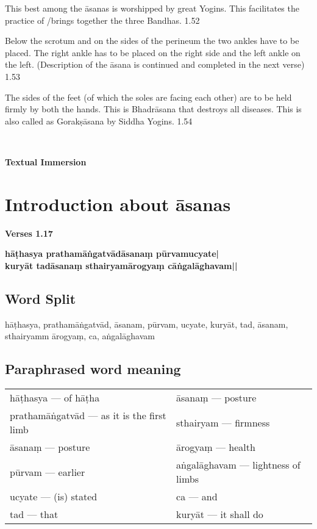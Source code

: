 This best among the āsanas is worshipped by great Yogins. This facilitates the practice of /brings together the three Bandhas.  1.52
\medskip


Below the scrotum and on the sides of the perineum the two ankles have to be placed. The right ankle has to be placed on the right side and the left ankle on the left. (Description of the āsana is continued and completed in the next verse) 1.53

The sides of the feet (of which the soles are facing each other) are to be held firmly by both the hands. This is Bhadrāsana that destroys all diseases. This is also called as Gorakṣāsana by Siddha Yogins. 1.54
\newpage

\thispagestyle{empty}
~
\vfill
\begin{center}
\textbf{\Huge Textual Immersion}
\end{center}
\vfill
\eject

\section*{Introduction about āsanas}


\noindent \textbf{Verses 1.17}

\begin{shloka}
\textbf{hāṭhasya prathamāṅgatvādāsanaṃ pūrvamucyate|}\\
\textbf{kuryāt tadāsanaṃ sthairyamārogyaṃ  cāṅgalāghavam||}
\end{shloka}

\subsection*{Word Split}

hāṭhasya, prathamāṅgatvād, āsanam, pūrvam, ucyate, kuryāt,  tad, āsanam, sthairyamm ārogyaṃ,  ca, aṅgalāghavam

\subsection*{Paraphrased word meaning}

\begin{longtable}{>{\noindent\raggedright}p{5cm}>{\noindent\raggedright}p{5cm}}
hāṭhasya --- of hāṭha & āsanaṃ --- posture\tabularnewline
prathamāṅgatvād --- as it is the first limb & sthairyam --- firmness\tabularnewline
āsanaṃ --- posture & ārogyaṃ --- health\tabularnewline
pūrvam --- earlier & aṅgalāghavam --- lightness of limbs\tabularnewline
ucyate --- (is) stated & ca --- and\tabularnewline
tad --- that & kuryāt --- it shall do
\end{longtable}


